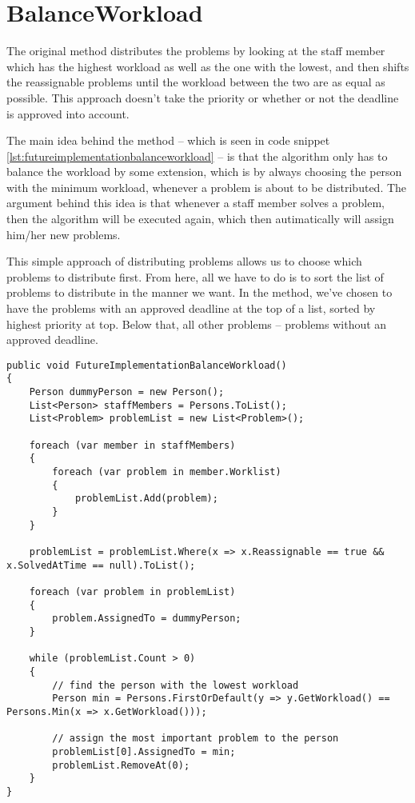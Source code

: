 \section{BalanceWorkload}
\label{sec:futureimplementationbalanceworkload}

The original  method distributes the problems by looking at the staff member which has the highest workload as well as the one with the lowest, and then shifts the reassignable problems until the workload between the two are as equal as possible. This approach doesn't take the priority or whether or not the deadline is approved into account. 

The main idea behind the  method -- which is seen in code snippet \ref{lst:futureimplementationbalanceworkload} -- is that the algorithm only has to balance the workload by some extension, which is by always choosing the person with the minimum workload, whenever a problem is about to be distributed. The argument behind this idea is that whenever a staff member solves a problem, then the algorithm will be executed again, which then autimatically will assign him/her new problems.

This simple approach of distributing problems allows us to choose which problems to distribute first. From here, all we have to do is to sort the list of problems to distribute in the manner we want. In the  method, we've chosen to have the problems with an approved deadline at the top of a list, sorted by highest priority at top. Below that, all other problems -- problems without an approved deadline.

\begin{lstlisting}[style=sourceCode, caption=\myCaption{A possible future implementation of the \me{BalanceWorkload} algorithm.}, label=lst:futureimplementationbalanceworkload]
public void FutureImplementationBalanceWorkload()
{
    Person dummyPerson = new Person();
    List<Person> staffMembers = Persons.ToList();
    List<Problem> problemList = new List<Problem>();

    foreach (var member in staffMembers)
    {
        foreach (var problem in member.Worklist)
        {
            problemList.Add(problem);
        }
    }

    problemList = problemList.Where(x => x.Reassignable == true && x.SolvedAtTime == null).ToList();

    foreach (var problem in problemList)
    {
        problem.AssignedTo = dummyPerson;
    }

    while (problemList.Count > 0)
    {
        // find the person with the lowest workload
        Person min = Persons.FirstOrDefault(y => y.GetWorkload() == Persons.Min(x => x.GetWorkload()));

        // assign the most important problem to the person
        problemList[0].AssignedTo = min;
        problemList.RemoveAt(0);
    }
}
\end{lstlisting}
